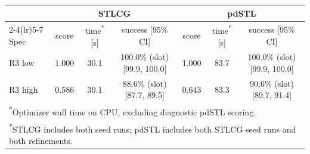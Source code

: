 \begin{tabular}{lcccccc}
\toprule
 & \multicolumn{3}{c}{STLCG} & \multicolumn{3}{c}{pdSTL} \\
\cmidrule(lr){2-4}\cmidrule(lr){5-7}
Spec & score & time\textsuperscript{*} [s] & success [95\% CI] & score & time\textsuperscript{*} [s] & success [95\% CI] \\
\midrule
R3 low & 1.000 & 30.1 & 100.0\% (slot) [99.9, 100.0] & 1.000 & 83.7 & 100.0\% (slot) [99.9, 100.0] \\
R3 high & 0.586 & 30.1 & 88.6\% (slot) [87.7, 89.5] & 0.643 & 83.3 & 90.6\% (slot) [89.7, 91.4] \\
\bottomrule
\multicolumn{7}{l}{\footnotesize\textsuperscript{*}Optimizer wall time on CPU, excluding diagnostic pdSTL scoring.} \\
\multicolumn{7}{l}{\footnotesize\textsuperscript{*}STLCG includes both seed runs; pdSTL includes both STLCG seed runs and both refinements.} \\
\end{tabular}
